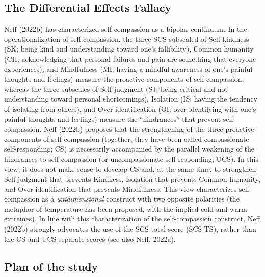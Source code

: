 \documentclass[
  man]{apa7}
\begin{document}
\hypertarget{the-differential-effects-fallacy}{%
\subsection{The Differential Effects Fallacy}\label{the-differential-effects-fallacy}}

Neff (2022b) has characterized self-compassion as a bipolar continuum. In the operationalization of self-compassion, the three SCS subscaled of Self-kindness (SK; being kind and understanding toward one's fallibility), Common humanity (CH; acknowledging that personal failures and pain are something that everyone experiences), and Mindfulness (MI; having a mindful awareness of one's painful thoughts and feelings) measure the proactive components of self-compassion, whereas the three subscales of Self-judgment (SJ; being critical and not understanding toward personal shortcomings), Isolation (IS; having the tendency of isolating from others), and Over-identification (OI; over-identifying with one's painful thoughts and feelings) measure the ``hindrances'' that prevent self-compassion. Neff (2022b) proposes that the strengthening of the three proactive components of self-compassion (together, they have been called compassionate self-responding; CS) is necessarily accompanied by the parallel weakening of the hindrances to self-compassion (or uncompassionate self-responding; UCS). In this view, it does not make sense to develop CS and, at the same time, to strengthen Self-judgment that prevents Kindness, Isolation that prevents Common humanity, and Over-identification that prevents Mindfulness. This view characterizes self-compassion as a \emph{unidimensional} construct with two opposite polarities (the metaphor of temperature has been proposed, with the implied cold and warm extremes). In line with this characterization of the self-compassion construct, Neff (2022b) strongly advocates the use of the SCS total score (SCS-TS), rather than the CS and UCS separate scores (see also Neff, 2022a).

\hypertarget{plan-of-the-study}{%
\subsection{Plan of the study}\label{plan-of-the-study}}
\end{document}
